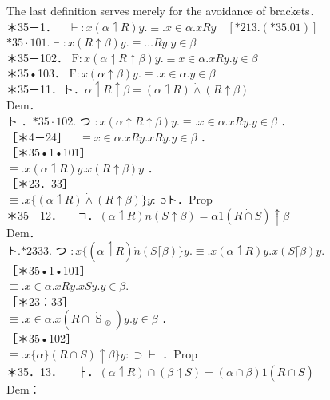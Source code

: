 \documentclass[10pt]{article}
\begin{document}
The last definition serves merely for the avoidance of brackets．\\
＊35－1．$\quad \vdash: x(\alpha \upharpoonleft R) y . \equiv . x \in \alpha . x R y \quad[* 213 .(* 35.01)]$\\
$* 35 \cdot 101 . \vdash: x(R \uparrow \beta) y . \equiv \ldots R y . y \in \beta$\\
＊35－102． $\mathrm{F}: x(\alpha \upharpoonleft R \uparrow \beta) y . \equiv x \in \alpha . x R y . y \in \beta$\\
＊35•103． $\mathrm{F}: x(\alpha \uparrow \beta) y . \equiv . x \in \alpha . y \in \beta$\\
＊35－11．ト．$\alpha \upharpoonleft R \uparrow \beta=(\alpha \upharpoonleft R) \dot{\wedge}(R \uparrow \beta)$\\
Dem．\\
ト ．$* 35 \cdot 102$. つ $: x(\alpha \uparrow R \uparrow \beta) y . \equiv . x \in \alpha . x R y . y \in \beta$ ．\\
［＊4－24］$\quad \equiv x \in \alpha . x R y . x R y . y \in \beta$ ．\\
［＊35•1•101］\\
$\equiv . x(\alpha \upharpoonleft R) y . x(R \uparrow \beta) y$ ．\\
［＊23．33］\\
$\equiv . x\{(\alpha \upharpoonleft R) \dot{\wedge}(R \uparrow \beta)\} y:$ ɔト．Prop\\
＊35－12．$\quad$ ㄱ．$(\alpha \upharpoonleft R) \dot{n}(S \uparrow \beta)=\alpha 1(R \dot{\cap} S) \uparrow \beta$\\
Dem．\\
ト.$* 2333$. つ $: x\{(\alpha \upharpoonleft \dot{R}) \dot{n}(S\lceil\beta)\} y . \equiv . x(\alpha \upharpoonleft R) y . x(S\lceil\beta) y$.\\
［＊35•1•101］\\
$\equiv . x \in \alpha . x R y . x S y . y \in \beta$.\\
［＊23：33］\\
$\equiv . x \in \alpha . x\left(R \cap \dot{\text { S }}_{\text {® }}\right) y . y \in \beta$ ．\\
［＊35•102］\\
$\equiv . x\{\alpha\}(R \cap S) \uparrow \beta\} y: \supset \vdash$ ．Prop\\
＊35．13．$\quad$ ㅏ．$(\alpha \upharpoonleft R) \dot{\cap}(\beta \upharpoonleft S)=(\alpha \cap \beta) 1(R \dot{\cap} S)$\\
Dem：
\end{document}
